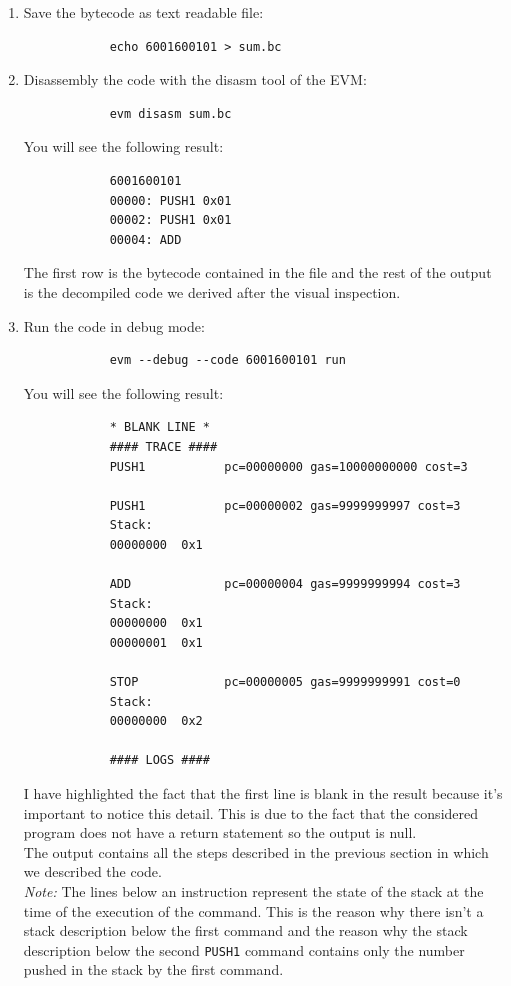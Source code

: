 \documentclass{scrbook}
\begin{document}
\begin{enumerate}
    \item
        Save the bytecode as text readable file:
        \begin{lstlisting}
            echo 6001600101 > sum.bc
        \end{lstlisting}

    \item
        Disassembly the code with the disasm tool of the EVM:
        \begin{lstlisting}
            evm disasm sum.bc
        \end{lstlisting}
        You will see the following result:
        \begin{lstlisting}
            6001600101
            00000: PUSH1 0x01
            00002: PUSH1 0x01
            00004: ADD
        \end{lstlisting}
        The first row is the bytecode contained in the file and the rest of the output is the decompiled code we derived after the visual inspection.

    \item 
        Run the code in debug mode:
        \begin{lstlisting}
            evm --debug --code 6001600101 run
        \end{lstlisting}
        You will see the following result:
        \begin{lstlisting}
            * BLANK LINE *
            #### TRACE ####
            PUSH1           pc=00000000 gas=10000000000 cost=3
            
            PUSH1           pc=00000002 gas=9999999997 cost=3
            Stack:
            00000000  0x1
            
            ADD             pc=00000004 gas=9999999994 cost=3
            Stack:
            00000000  0x1
            00000001  0x1
            
            STOP            pc=00000005 gas=9999999991 cost=0
            Stack:
            00000000  0x2
            
            #### LOGS ####
        \end{lstlisting}
        I have highlighted the fact that the first line is blank in the result because it's important to notice this detail. This is due to the fact that the considered program does not have a return statement so the output is null.\\

        The output contains all the steps described in the previous section in which we described the code.\\
        \noindent
        \textit{Note:} The lines below an instruction represent the state of the stack at the time of the execution of the command. This is the reason why there isn't a stack description below the first command and the reason why the stack description below the second \texttt{PUSH1} command contains only the number pushed in the stack by the first command.
\end{enumerate}
\end{document}
